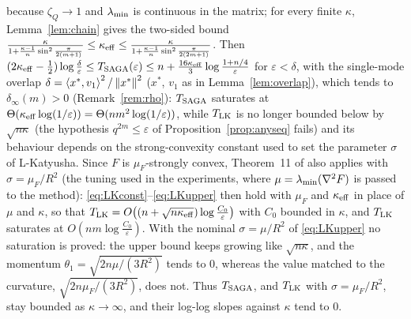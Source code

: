 \begin{proposition}
\begin{enumerate}[nosep,label=(\roman*)]
because $\zeta_Q\to1$ and $\lambda_{\min}$ is continuous in the matrix; for every finite $\kappa$, Lemma~\ref{lem:chain} gives the two-sided bound $\frac{\kappa}{1+\frac{\kappa-1}{n}\sin^2\frac{\pi}{2(m+1)}}\le\kappa_{\rm eff}\le\frac{\kappa}{1+\frac{\kappa-1}{n}\sin^2\frac{\pi}{2(2m+1)}}$. Then $(2\kappa_{\rm eff}-\frac12)\log\frac\delta\varepsilon\le T_{\rm SAGA}(\varepsilon)\le n+\frac{16\kappa_{\rm eff}}3\log\frac{1+n/4}\varepsilon$ for $\varepsilon<\delta$, with the single-mode overlap $\delta=\left\langle x^\ast, v_1 \right\rangle^2/\left\|x^\ast\right\|^2$ ($x^\ast$, $v_1$ as in Lemma~\ref{lem:overlap}), which tends to $\delta_\infty(m)>0$ (Remark~\ref{rem:rho}): $T_{\rm SAGA}$ saturates at $\Theta(\kappa_{\rm eff}\log(1/\varepsilon))=\Theta(nm^2\log(1/\varepsilon))$, while $T_{\rm LK}$ is no longer bounded below by $\sqrt{n\kappa}$ (the hypothesis $q^{2m}\le\varepsilon$ of Proposition~\ref{prop:anyseq} fails) and its behaviour depends on the strong-convexity constant used to set the parameter $\sigma$ of L-Katyusha. Since $F$ is $\mu_F$-strongly convex, Theorem~11 of \cite{kovalev2020dont} also applies with $\sigma=\mu_F/R^2$ (the tuning used in the experiments, where $\mu=\lambda_{\min}(\nabla^2F)$ is passed to the method): \eqref{eq:LKconst}--\eqref{eq:LKupper} then hold with $\mu_F$ and $\kappa_{\rm eff}$ in place of $\mu$ and $\kappa$, so that $T_{\rm LK}=O\big((n+\sqrt{n\kappa_{\rm eff}})\log\frac{C_0}\varepsilon\big)$ with $C_0$ bounded in $\kappa$, and $T_{\rm LK}$ saturates at $O(nm\log\frac{C_0}\varepsilon)$. With the nominal $\sigma=\mu/R^2$ of \eqref{eq:LKupper} no saturation is proved: the upper bound keeps growing like $\sqrt{n\kappa}$, and the momentum $\theta_1=\sqrt{2n\mu/(3R^2)}$ tends to $0$, whereas the value matched to the curvature, $\sqrt{2n\mu_F/(3R^2)}$, does not. Thus $T_{\rm SAGA}$, and $T_{\rm LK}$ with $\sigma=\mu_F/R^2$, stay bounded as $\kappa\to\infty$, and their log-log slopes against $\kappa$ tend to $0$.
\end{enumerate}
\end{proposition}

